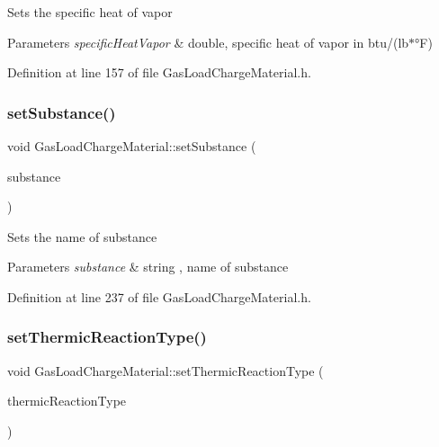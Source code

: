 Sets the specific heat of vapor 
\begin{DoxyParams}{Parameters}
{\em specific\+Heat\+Vapor} & double, specific heat of vapor in btu/(lb$\ast$°F) \\
\hline
\end{DoxyParams}


Definition at line 157 of file Gas\+Load\+Charge\+Material.\+h.

\mbox{\label{class_gas_load_charge_material_a20cc3df601d8daae9b8f8e7b0c53c2e3}} 
\subsubsection{\texorpdfstring{set\+Substance()}{setSubstance()}}
{\footnotesize\ttfamily void Gas\+Load\+Charge\+Material\+::set\+Substance (\begin{DoxyParamCaption}\item[{std\+::string}]{substance }\end{DoxyParamCaption})\hspace{0.3cm}{\ttfamily [inline]}}

Sets the name of substance 
\begin{DoxyParams}{Parameters}
{\em substance} & string , name of substance \\
\hline
\end{DoxyParams}


Definition at line 237 of file Gas\+Load\+Charge\+Material.\+h.

\mbox{\label{class_gas_load_charge_material_ac48eb07a3008f1dc0ff433353b59536d}} 
\subsubsection{\texorpdfstring{set\+Thermic\+Reaction\+Type()}{setThermicReactionType()}}
{\footnotesize\ttfamily void Gas\+Load\+Charge\+Material\+::set\+Thermic\+Reaction\+Type (\begin{DoxyParamCaption}\item[{\hyperlink{namespace_load_charge_material_a51d4263e865a5d86236622dd3fe23fd1}{Load\+Charge\+Material\+::\+Thermic\+Reaction\+Type}}]{thermic\+Reaction\+Type }\end{DoxyParamCaption})\hspace{0.3cm}{\ttfamily [inline]}}


